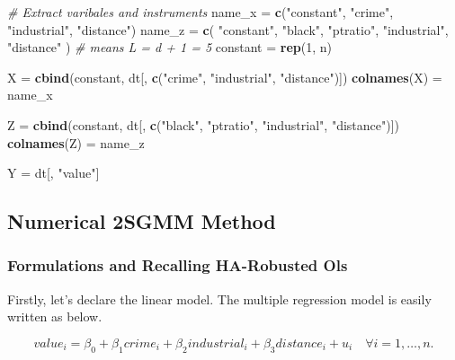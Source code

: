 \documentclass[
  12pt,
]{article}
\newenvironment{Shaded}{\begin{snugshade}}{\end{snugshade}}
\newcommand{\CommentTok}[1]{\textcolor[rgb]{0.56,0.35,0.01}{\textit{#1}}}
\newcommand{\DecValTok}[1]{\textcolor[rgb]{0.00,0.00,0.81}{#1}}
\newcommand{\KeywordTok}[1]{\textcolor[rgb]{0.13,0.29,0.53}{\textbf{#1}}}
\newcommand{\NormalTok}[1]{#1}
\newcommand{\StringTok}[1]{\textcolor[rgb]{0.31,0.60,0.02}{#1}}
\begin{document}
\begin{Shaded}
\begin{Highlighting}[]
\CommentTok{\# Extract varibales and instruments}
\NormalTok{name\_x =}\StringTok{ }\KeywordTok{c}\NormalTok{(}\StringTok{"constant"}\NormalTok{, }\StringTok{"crime"}\NormalTok{, }\StringTok{"industrial"}\NormalTok{, }\StringTok{"distance"}\NormalTok{)}
\NormalTok{name\_z =}\StringTok{ }\KeywordTok{c}\NormalTok{(}
    \StringTok{"constant"}\NormalTok{, }\StringTok{"black"}\NormalTok{,  }\StringTok{"ptratio"}\NormalTok{, }\StringTok{"industrial"}\NormalTok{, }\StringTok{"distance"}
\NormalTok{) }\CommentTok{\# means L = d + 1 = 5}
\NormalTok{constant =}\StringTok{ }\KeywordTok{rep}\NormalTok{(}\DecValTok{1}\NormalTok{, n)}

\NormalTok{X =}\StringTok{ }\KeywordTok{cbind}\NormalTok{(constant, dt[, }\KeywordTok{c}\NormalTok{(}\StringTok{"crime"}\NormalTok{, }\StringTok{"industrial"}\NormalTok{, }\StringTok{"distance"}\NormalTok{)])}
\KeywordTok{colnames}\NormalTok{(X) =}\StringTok{ }\NormalTok{name\_x}

\NormalTok{Z =}\StringTok{ }\KeywordTok{cbind}\NormalTok{(constant, dt[, }\KeywordTok{c}\NormalTok{(}\StringTok{"black"}\NormalTok{, }\StringTok{"ptratio"}\NormalTok{, }\StringTok{"industrial"}\NormalTok{, }\StringTok{"distance"}\NormalTok{)])}
\KeywordTok{colnames}\NormalTok{(Z) =}\StringTok{ }\NormalTok{name\_z}

\NormalTok{Y =}\StringTok{ }\NormalTok{dt[, }\StringTok{"value"}\NormalTok{]   }
\end{Highlighting}
\end{Shaded}

\newpage

\hypertarget{numerical-2sgmm-method}{%
\subsection{Numerical 2SGMM Method}\label{numerical-2sgmm-method}}

\hypertarget{formulations-and-recalling-ha-robusted-ols}{%
\subsubsection{Formulations and Recalling HA-Robusted Ols}\label{formulations-and-recalling-ha-robusted-ols}}

Firstly, let's declare the linear model. The multiple regression model is easily written as below.

\[
    value_i = \beta_0 + \beta_1 crime_i + \beta_2 industrial_i + \beta_3 distance_i + u_i \quad \forall i = 1, \dots, n.
\]
\end{document}
